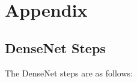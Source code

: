 
\section{Appendix}
\label{app:app001}

\hfill

\subsection{DenseNet Steps}
\label{app:steps}

\hfill

\noindent
The DenseNet steps are as follows:

\hfill

